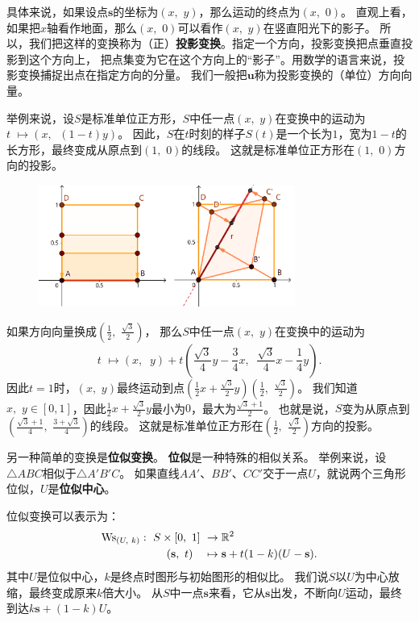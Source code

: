 \documentclass[12pt,UTF8]{ctexbook}
\begin{document}
具体来说，如果设点$\mathbf{s}$的坐标为$(x,\,\,y)$，那么运动的终点为$(x,\,\,0)$。
直观上看，如果把$x$轴看作地面，那么$(x,\,\,0)$可以看作$(x,\,\,y)$在竖直阳光下的影子。
所以，我们把这样的变换称为（正）\textbf{投影变换}。指定一个方向，投影变换把点垂直投影到这个方向上，
把点集变为它在这个方向上的“影子”。用数学的语言来说，投影变换捕捉出点在指定方向的分量。
我们一般把$\mathbf{u}$称为投影变换的（单位）方向向量。

举例来说，设$S$是标准单位正方形，$S$中任一点$(x,\,\,y)$在变换中的运动为$t\,\,\mapsto (x,\,\,\ (1 - t)y)$。
因此，$S$在$t$时刻的样子$S(t)$是一个长为$1$，宽为$1 - t$的长方形，最终变成从原点到$(1,\,\,0)$的线段。
这就是标准单位正方形在$(1,\,\,0)$方向的投影。

\begin{figure}[h] %
    \vspace{4pt}
    \centering
    \includegraphics[width=0.75\textwidth]{投影变换例1.png}
\end{figure}

如果方向向量换成$(\frac{1}{2},\,\,\frac{\sqrt{3}}{2})$，
那么$S$中任一点$(x,\,\,y)$在变换中的运动为
$$t\,\,\mapsto (x,\,\,\ y) + t\left(\frac{\sqrt{3}}{4}y - \frac{3}{4}x,\,\,\ \frac{\sqrt{3}}{4}x - \frac{1}{4}y\right).$$
因此$t=1$时，$(x,\,\,y)$最终运动到点$\left(\frac{1}{2}x + \frac{\sqrt{3}}{2}y\right)(\frac{1}{2},\,\,\frac{\sqrt{3}}{2})$。
我们知道$x,\,\,y\in[0,1]$，因此$\frac{1}{2}x + \frac{\sqrt{3}}{2}y$最小为$0$，最大为$\frac{\sqrt{3}+1}{2}$。
也就是说，$S$变为从原点到$(\frac{\sqrt{3} + 1}{4},\,\,\frac{3 + \sqrt{3}}{4})$的线段。
这就是标准单位正方形在$(\frac{1}{2},\,\,\frac{\sqrt{3}}{2})$方向的投影。

另一种简单的变换是\textbf{位似变换}。
\textbf{位似}是一种特殊的相似关系。
举例来说，设$\triangle ABC$相似于$\triangle A'B'C$。
如果直线$AA'$、$BB'$、$CC'$交于一点$U$，就说两个三角形位似，$U$是\textbf{位似中心}。

位似变换可以表示为：
\begin{align}
    \mathrm{Ws}_{(U, \,\,k)}: \,\, S\times[0,\,\,1] \,\,&\rightarrow \mathbb{R}^2 \notag \\
    (\mathbf{s},\,\, t) \quad &\mapsto \mathbf{s} + t(1 - k)(U - \mathbf{s}). \notag
\end{align}
其中$U$是位似中心，$k$是终点时图形与初始图形的相似比。
我们说$S$以$U$为中心放缩，最终变成原来$k$倍大小。
从$S$中一点$\mathbf{s}$来看，它从$\mathbf{s}$出发，不断向$U$运动，最终到达$k\mathbf{s} + (1 - k)U$。
\end{document}
